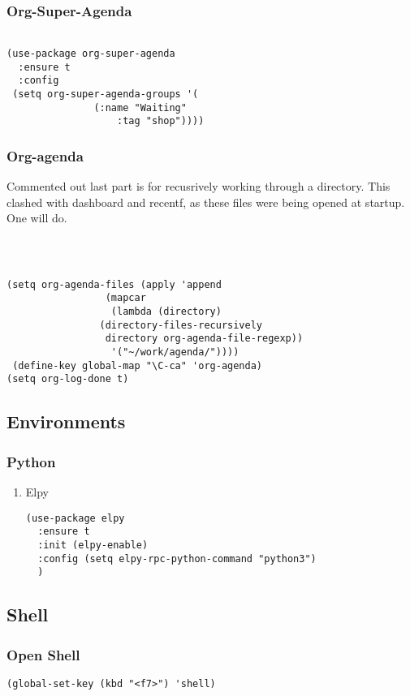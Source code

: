 \documentclass[11pt]{article}
\begin{document}
\subsubsection{Org-Super-Agenda}
\label{sec:org6ef1098}
\begin{verbatim}

(use-package org-super-agenda
  :ensure t
  :config
 (setq org-super-agenda-groups '(
			   (:name "Waiting"
			       :tag "shop"))))
\end{verbatim}

\subsubsection{Org-agenda}
\label{sec:org2769f27}

Commented out last part is for recusrively working through a directory.  This clashed with dashboard and recentf, as these files were being opened at startup.  One will do. 


\begin{verbatim}



(setq org-agenda-files (apply 'append
			     (mapcar
			      (lambda (directory)
				(directory-files-recursively
				 directory org-agenda-file-regexp))
			      '("~/work/agenda/"))))
 (define-key global-map "\C-ca" 'org-agenda)
(setq org-log-done t)

\end{verbatim}

\subsection{Environments}
\label{sec:org3f1db97}
\subsubsection{Python}
\label{sec:org1cd14a5}
\begin{enumerate}
\item Elpy
\label{sec:org401454d}
\begin{verbatim}
(use-package elpy
  :ensure t
  :init (elpy-enable)
  :config (setq elpy-rpc-python-command "python3")
  )
\end{verbatim}
\end{enumerate}
\subsection{Shell}
\label{sec:org1770a72}
\subsubsection{Open Shell}
\label{sec:org3b8083f}
\begin{verbatim}
(global-set-key (kbd "<f7>") 'shell)
\end{verbatim}
\end{document}
